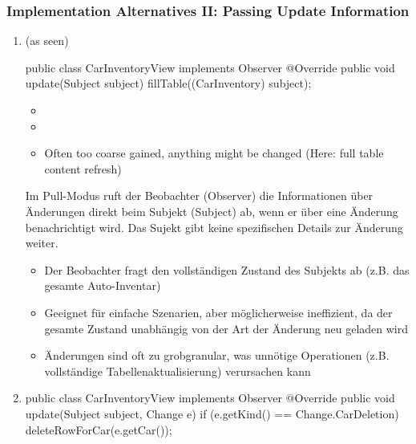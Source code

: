 \subsubsection{Implementation Alternatives II: Passing Update Information}
\begin{enumerate}
    \item {} (as seen)
    \begin{codeBlock}{}
        public class CarInventoryView implements Observer{
            @Override
            public void update(Subject subject){
                fillTable((CarInventory) subject);
            }
        }
    \end{codeBlock}
    \begin{itemize}
        \item {}
        \item {}
        \item Often too coarse gained, anything might be changed (Here: full table content refresh)
    \end{itemize}
    \begin{infoBox}
        Im Pull-Modus ruft der Beobachter (Observer) die Informationen über Änderungen direkt beim Subjekt (Subject) ab, wenn er über eine Änderung benachrichtigt wird. Das Sujekt gibt keine spezifischen Details zur Änderung weiter.\\
        \begin{itemize}
            \item Der Beobachter fragt den vollständigen Zustand des Subjekts ab (z.B. das gesamte Auto-Inventar)
            \item Geeignet für einfache Szenarien, aber möglicherweise ineffizient, da der gesamte Zustand unabhängig von der Art der Änderung neu geladen wird
            \item {} Änderungen sind oft zu grobgranular, was unnötige Operationen (z.B. vollständige Tabellenaktualisierung) verursachen kann
        \end{itemize}
    \end{infoBox}
    \item {}
    \begin{codeBlock}{}
        public class CarInventoryView implements Observer{
            @Override
            public void update(Subject subject, Change e){
                if (e.getKind() == Change.CarDeletion){
                    deleteRowForCar(e.getCar());
}}}
\end{codeBlock}
\end{enumerate}
